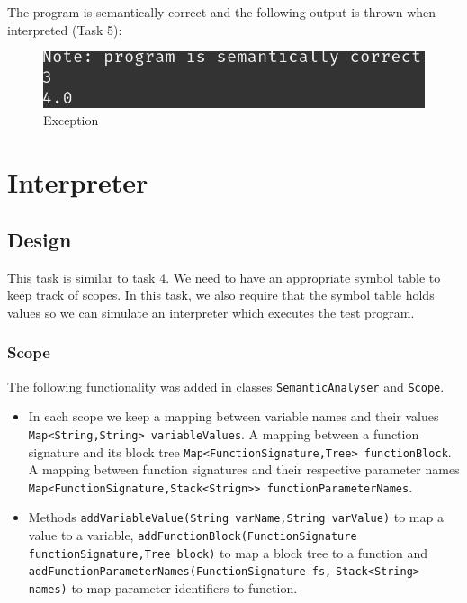 \begin{itemize}
	      	      	      
	      The program is semantically correct and the following output is thrown when interpreted (Task 5):
	      \begin{figure}[H]
	      	\centering
	      	\includegraphics[scale=1]{Task345/images/semantically-correct-program.png}
	      	\caption{Exception}
	      	\label{fig:exception function not expected to return}
	      \end{figure}    
	      	      	          
\end{itemize}

\chapter{Interpreter}
\label{sec:interpreter design}
\section{Design}
This task is similar to task 4. We need to have an appropriate symbol table to keep track of scopes. In this task, we also require that the symbol table holds values so we can simulate an interpreter which executes the test program.

\subsection{Scope}
The following functionality was added in classes \verb!SemanticAnalyser! and \verb!Scope!.
\begin{itemize}
	\item In each scope we keep a mapping between variable names and their values \verb!Map<String,String> variableValues!. A mapping between a function signature and its block tree \verb!Map<FunctionSignature,Tree> functionBlock!. A mapping between function signatures and their respective parameter names \verb!Map<FunctionSignature,Stack<Strign>> functionParameterNames!.
	      	      	         
	\item  Methods \verb!addVariableValue(String varName,String varValue)! to map a value to a variable, \verb!addFunctionBlock(FunctionSignature functionSignature,Tree block)! to map a block tree to a function and \verb!addFunctionParameterNames(FunctionSignature fs,!
	      \verb!Stack<String> names)! to map parameter identifiers to function.
\end{itemize}

